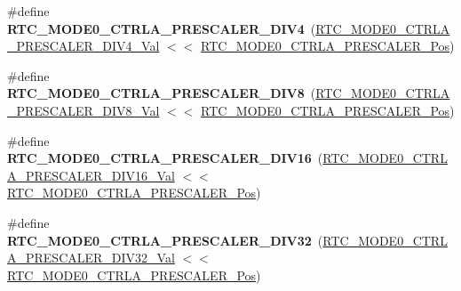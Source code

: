 \begin{DoxyCompactItemize}
\item 
\hypertarget{group___s_a_m_l21___r_t_c_gac58be91436658c743f4326491535ea8f}{}\#define {\bfseries R\+T\+C\+\_\+\+M\+O\+D\+E0\+\_\+\+C\+T\+R\+L\+A\+\_\+\+P\+R\+E\+S\+C\+A\+L\+E\+R\+\_\+\+D\+I\+V4}~(\hyperlink{group___s_a_m_l21___r_t_c_gaea5706997088d201a2506cd0c04f6916}{R\+T\+C\+\_\+\+M\+O\+D\+E0\+\_\+\+C\+T\+R\+L\+A\+\_\+\+P\+R\+E\+S\+C\+A\+L\+E\+R\+\_\+\+D\+I\+V4\+\_\+\+Val} $<$$<$ \hyperlink{group___s_a_m_l21___r_t_c_ga0dbb76324e6c9c6d9391c96723e6e59b}{R\+T\+C\+\_\+\+M\+O\+D\+E0\+\_\+\+C\+T\+R\+L\+A\+\_\+\+P\+R\+E\+S\+C\+A\+L\+E\+R\+\_\+\+Pos})\label{group___s_a_m_l21___r_t_c_gac58be91436658c743f4326491535ea8f}

\item 
\hypertarget{group___s_a_m_l21___r_t_c_ga050d21ec4c17c8371dcb87832501c17e}{}\#define {\bfseries R\+T\+C\+\_\+\+M\+O\+D\+E0\+\_\+\+C\+T\+R\+L\+A\+\_\+\+P\+R\+E\+S\+C\+A\+L\+E\+R\+\_\+\+D\+I\+V8}~(\hyperlink{group___s_a_m_l21___r_t_c_ga81e7e7964ee437deccfd5bf972ea3aa1}{R\+T\+C\+\_\+\+M\+O\+D\+E0\+\_\+\+C\+T\+R\+L\+A\+\_\+\+P\+R\+E\+S\+C\+A\+L\+E\+R\+\_\+\+D\+I\+V8\+\_\+\+Val} $<$$<$ \hyperlink{group___s_a_m_l21___r_t_c_ga0dbb76324e6c9c6d9391c96723e6e59b}{R\+T\+C\+\_\+\+M\+O\+D\+E0\+\_\+\+C\+T\+R\+L\+A\+\_\+\+P\+R\+E\+S\+C\+A\+L\+E\+R\+\_\+\+Pos})\label{group___s_a_m_l21___r_t_c_ga050d21ec4c17c8371dcb87832501c17e}

\item 
\hypertarget{group___s_a_m_l21___r_t_c_ga4c6e2c2fd823a5898e9467931ab3a3a2}{}\#define {\bfseries R\+T\+C\+\_\+\+M\+O\+D\+E0\+\_\+\+C\+T\+R\+L\+A\+\_\+\+P\+R\+E\+S\+C\+A\+L\+E\+R\+\_\+\+D\+I\+V16}~(\hyperlink{group___s_a_m_l21___r_t_c_ga62efca2a59d2f5f4d4f91111f58f63d0}{R\+T\+C\+\_\+\+M\+O\+D\+E0\+\_\+\+C\+T\+R\+L\+A\+\_\+\+P\+R\+E\+S\+C\+A\+L\+E\+R\+\_\+\+D\+I\+V16\+\_\+\+Val} $<$$<$ \hyperlink{group___s_a_m_l21___r_t_c_ga0dbb76324e6c9c6d9391c96723e6e59b}{R\+T\+C\+\_\+\+M\+O\+D\+E0\+\_\+\+C\+T\+R\+L\+A\+\_\+\+P\+R\+E\+S\+C\+A\+L\+E\+R\+\_\+\+Pos})\label{group___s_a_m_l21___r_t_c_ga4c6e2c2fd823a5898e9467931ab3a3a2}

\item 
\hypertarget{group___s_a_m_l21___r_t_c_ga1cf0a6aa4f17ebe08ea5b4f779d64c6e}{}\#define {\bfseries R\+T\+C\+\_\+\+M\+O\+D\+E0\+\_\+\+C\+T\+R\+L\+A\+\_\+\+P\+R\+E\+S\+C\+A\+L\+E\+R\+\_\+\+D\+I\+V32}~(\hyperlink{group___s_a_m_l21___r_t_c_ga4e08f6012df659fcc083c758f67ebd6e}{R\+T\+C\+\_\+\+M\+O\+D\+E0\+\_\+\+C\+T\+R\+L\+A\+\_\+\+P\+R\+E\+S\+C\+A\+L\+E\+R\+\_\+\+D\+I\+V32\+\_\+\+Val} $<$$<$ \hyperlink{group___s_a_m_l21___r_t_c_ga0dbb76324e6c9c6d9391c96723e6e59b}{R\+T\+C\+\_\+\+M\+O\+D\+E0\+\_\+\+C\+T\+R\+L\+A\+\_\+\+P\+R\+E\+S\+C\+A\+L\+E\+R\+\_\+\+Pos})\label{group___s_a_m_l21___r_t_c_ga1cf0a6aa4f17ebe08ea5b4f779d64c6e}


\end{DoxyCompactItemize}
